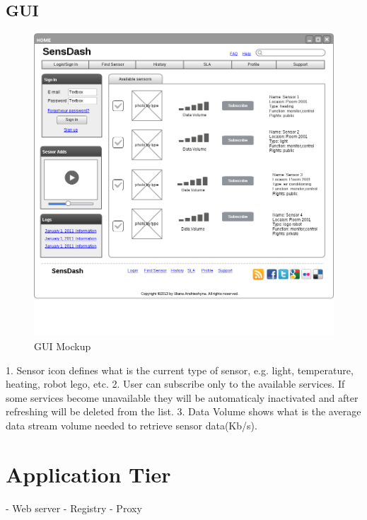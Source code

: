   \subsection{GUI}
  \begin{figure}[!ht]
  \centering
  \includegraphics[scale=0.5]{images/Mockup.png}   
  \caption[GUI Mocku]{GUI Mockup}
  \label{img:GUI Mockup}                           
  \end{figure}
  1. Sensor icon defines what is the current type of sensor, e.g. light, temperature, heating, robot lego, etc.
  2. User can subscribe only to the available services. If some services become unavailable they will be automaticaly inactivated and after refreshing will be deleted from the list.
  3. Data Volume shows what is the average data stream volume needed to retrieve sensor data(Kb/s).

\section{Application Tier}
- Web server
\newline
- Registry
\newline
- Proxy


